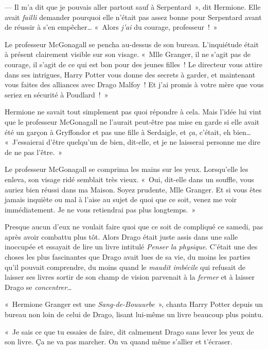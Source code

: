 --- Il m'a dit que je pouvais aller partout sauf à Serpentard~», dit Hermione. Elle avait \emph{failli} demander pourquoi elle n'était pas assez bonne pour Serpentard avant de réussir à s'en empêcher… «~Alors \emph{j'ai} du courage, professeur~!~»

Le professeur McGonagall se pencha au-dessus de son bureau. L'inquiétude était à présent clairement visible sur son visage. «~Mlle Granger, il ne s'agit pas de courage, il s'agit de ce qui est bon pour des jeunes filles~! Le directeur vous attire dans ses intrigues, Harry Potter vous donne des secrets à garder, et maintenant vous faites des alliances avec Drago Malfoy~! Et j'ai promis à votre mère que vous seriez en sécurité à Poudlard~!~»

Hermione ne savait tout simplement pas quoi répondre à cela. Mais l'idée lui vint que le professeur McGonagall ne l'aurait peut-être pas mise en garde si elle avait été un garçon à Gryffondor et pas une fille à Serdaigle, et \emph{ça}, c'était, eh bien… «~J'essaierai d'être quelqu'un de bien, dit-elle, et je ne laisserai personne me dire de ne pas l'être.~»

Le professeur McGonagall se comprima les mains sur les yeux. Lorsqu'elle les enleva, son visage ridé semblait très vieux. «~Oui, dit-elle dans un souffle, vous auriez bien réussi dans ma Maison. Soyez prudente, Mlle Granger. Et si vous êtes jamais inquiète ou mal à l'aise au sujet de quoi que ce soit, venez me voir immédiatement. Je ne vous retiendrai pas plus longtemps.~»


Presque aucun d'eux ne voulait faire quoi que ce soit de compliqué ce samedi, pas après avoir combattu plus tôt. Alors Drago était juste assis dans une salle inoccupée et essayait de lire un livre intitulé \emph{Penser la physique}. C'était une des choses les plus fascinantes que Drago avait lues de sa vie, du moins les parties qu'il pouvait comprendre, du moins quand le \emph{maudit imbécile} qui refusait de laisser ses livres sortir de son champ de vision parvenait à la \emph{fermer} et à laisser Drago se \emph{concentrer}…

«~Hermione Granger est une \emph{Sang-de-Bouuurbe}~», chanta Harry Potter depuis un bureau non loin de celui de Drago, lisant lui-même un livre beaucoup plus pointu.

«~Je sais ce que tu essaies de faire, dit calmement Drago sans lever les yeux de son livre. Ça ne va pas marcher. On va quand même s'allier et t'écraser.

